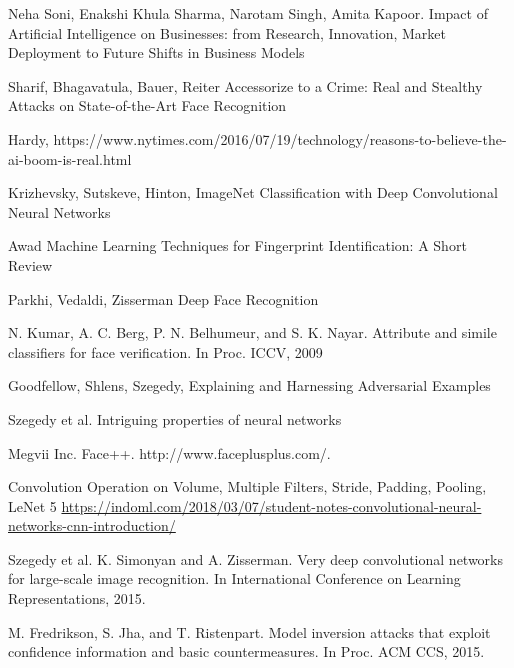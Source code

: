 Neha Soni, Enakshi Khula Sharma, Narotam Singh, Amita Kapoor.
Impact of Artificial Intelligence on Businesses: from Research, Innovation, Market
Deployment to Future Shifts in Business Models

Sharif, Bhagavatula, Bauer, Reiter
Accessorize to a Crime: Real and Stealthy Attacks on
State-of-the-Art Face Recognition


Hardy,
https://www.nytimes.com/2016/07/19/technology/reasons-to-believe-the-ai-boom-is-real.html

Krizhevsky, Sutskeve, Hinton,
ImageNet Classification with Deep Convolutional 
Neural Networks

Awad 
Machine Learning Techniques for Fingerprint
Identification: A Short Review

Parkhi, Vedaldi, Zisserman
Deep Face Recognition


N. Kumar, A. C. Berg, P. N. Belhumeur, and S. K.
Nayar. Attribute and simile classifiers for face
verification. In Proc. ICCV, 2009

Goodfellow, Shlens, Szegedy,
Explaining and Harnessing Adversarial Examples


Szegedy et al.
Intriguing properties of neural networks        

Megvii Inc. Face++. http://www.faceplusplus.com/.

Convolution Operation on Volume, Multiple Filters, Stride, Padding, Pooling, LeNet 5 \url{https://indoml.com/2018/03/07/student-notes-convolutional-neural-networks-cnn-introduction/}

Szegedy et al.
K. Simonyan and A. Zisserman. Very deep convolutional networks for large-scale image recognition. In International Conference on Learning Representations, 2015.

M. Fredrikson, S. Jha, and T. Ristenpart. Model
inversion attacks that exploit confidence information
and basic countermeasures. In Proc. ACM CCS, 2015.






